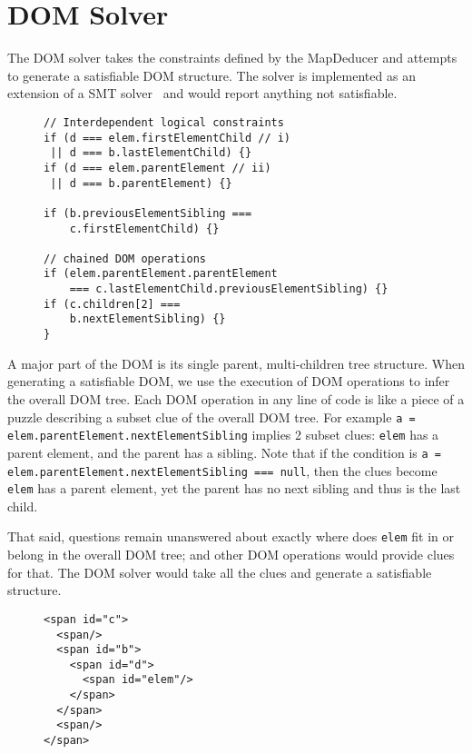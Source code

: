 \section{DOM Solver}
The DOM solver takes the constraints defined by the MapDeducer and attempts to generate a satisfiable DOM structure.  The solver is implemented as an extension of a SMT solver~\cite{cvc3} and would report anything not satisfiable.  

\begin{figure}
\begin{lstlisting}[caption=Example extended from Sample Code ~\ref{domOr} with more complex DOM operations and their interdependency with each other.  The added {\tt if} statements influence the solver to decide on {\tt i)} or {\tt ii)},label=domOrExtended]  
// Interdependent logical constraints
if (d === elem.firstElementChild // i)
 || d === b.lastElementChild) {}
if (d === elem.parentElement // ii)
 || d === b.parentElement) {}

if (b.previousElementSibling === 
    c.firstElementChild) {}

// chained DOM operations 
if (elem.parentElement.parentElement 
    === c.lastElementChild.previousElementSibling) {}  
if (c.children[2] === 
    b.nextElementSibling) {}  
}
\end{lstlisting}
\end{figure}

A major part of the DOM is its single parent, multi-children tree structure.  When generating a satisfiable DOM, we use the execution of DOM operations to infer the overall DOM tree.    
Each DOM operation in any line of code is like a piece of a puzzle describing a subset clue of the overall DOM tree.   
For example {\tt a = elem.parentElement.nextElementSibling} implies 2 subset clues: {\tt elem} has a parent element, and the parent has a sibling.  
Note that if the condition is {\tt a = elem.parentElement.nextElementSibling === null}, then the clues become {\tt elem} has a parent element, yet the parent has no next sibling and thus is the last child.

That said, questions remain unanswered about exactly where does {\tt elem} fit in or belong in the overall DOM tree; and other DOM operations would provide clues for that.  The DOM solver would take all the clues and generate a satisfiable structure.   

\begin{figure}
\begin{lstlisting}[caption=HTML generated for going the all {\tt true} path in Sample Code ~\ref{domOrExtended}.  The all {\tt true} path is the execution path in which every condition goes to the {\tt true} branch.,label=htmlExtended]  
<span id="c">
  <span/>
  <span id="b">
    <span id="d">
      <span id="elem"/>
    </span>
  </span>
  <span/>
</span>
\end{lstlisting}
\end{figure}


